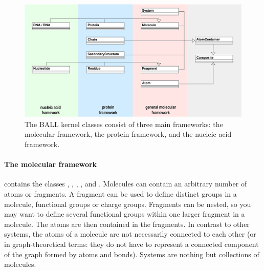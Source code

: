 \begin{figure}[tb]
  \centering\includegraphics[width=\textwidth]{kernel-data-structures.eps}
  \caption{The BALL kernel classes consist of three main frameworks: the
molecular framework, the protein framework, and the nucleic acid framework.}
  \label{figure:kernel-frameworks}
\end{figure}

\paragraph{The molecular framework} contains the classes ,
, , , and . 
Molecules can contain an arbitrary number of atoms or fragments. A fragment
can be used to define distinct groups in a molecule, \eg functional groups or
charge groups. Fragments can be nested, so you may want to define several
functional groups within one larger fragment in a molecule. The atoms are then
contained in the fragments. In contrast to other systems, the atoms of a
molecule are not necessarily connected to each other (or in graph-theoretical
terms: they do not have to represent a connected component of the graph
formed by atoms and bonds). Systems are nothing but collections of molecules.

